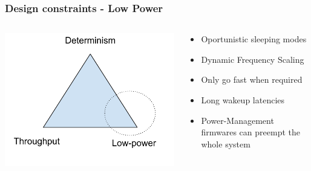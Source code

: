 \begin{frame}
	\frametitle{Design constraints - Low Power}
	\begin{columns}
	\begin{column}{0.35\textwidth}
	\includegraphics[width=\textwidth]{slides/realtime-linux-realtime-systems/triangle_design_power.pdf}
	\end{column}
		\begin{column}{0.65\textwidth}
			\begin{itemize}
				\item Oportunistic sleeping modes
				\item Dynamic Frequency Scaling
				\item Only go fast when required
				\item Long wakeup latencies
				\item Power-Management firmwares can preempt the whole system
			\end{itemize}
		\end{column}
	\end{columns}
\end{frame}

